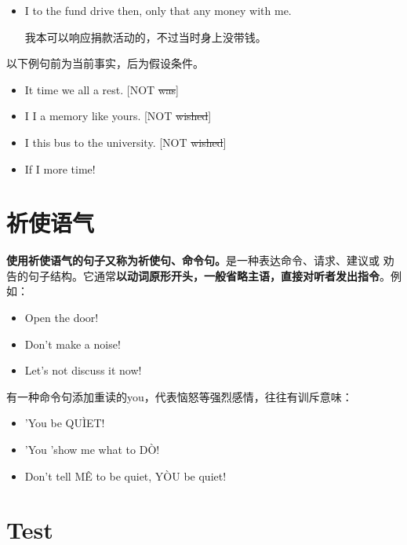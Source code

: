 \begin{itemize}
\item I  to the fund drive then, only that  any money with me.

  我本可以响应捐款活动的，不过当时身上没带钱。
\end{itemize}

以下例句前为当前事实，后为假设条件。
\begin{itemize}
\item It time we all  a rest. [NOT \sout{was}]

\item I  I  a memory like yours. [NOT \sout{wished}]

\item I  this bus  to the university. [NOT \sout{wished}]

\item  If  I  more time!
\end{itemize}

\section{祈使语气}

\textbf{使用祈使语气的句子又称为祈使句、命令句。}是一种表达命令、请求、建议或
劝告的句子结构。它通常\textbf{以动词原形开头，一般省略主语，直接对听者发出指令}。例
如：
\begin{itemize}
\item Open the door!

\item Don't make a noise!

\item Let's not discuss it now!
\end{itemize}

有一种命令句添加重读的you，代表恼怒等强烈感情，往往有训斥意味：
\begin{itemize}
\item 'You be QU\`IET!
\item 'You 'show me what to D\`O!

\item Don't tell M\^E to be quiet, Y\`OU be quiet!
\end{itemize}


\section{Test}

